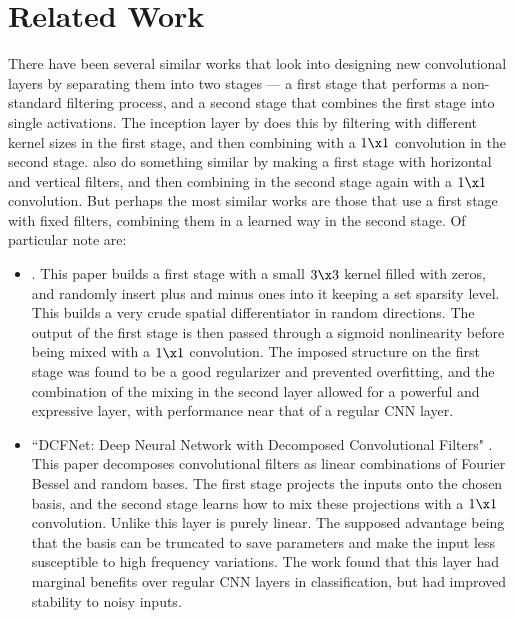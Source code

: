 \section{Related Work}\label{sec:ch5:related}

There have been several similar works that look into designing new convolutional
layers by separating them into two stages --- a first stage that performs a
non-standard filtering process, and a second stage that combines the first stage
into single activations. The inception layer 
\cite{szegedy_rethinking_2015} by \citeauthor*{szegedy_rethinking_2015} does this by filtering with different
kernel sizes in the first stage, and then combining with a $1\x 1$ convolution
in the second stage. \citeauthor*{ioannou_training_2015} also do something similar by making
a first stage with horizontal and vertical filters, and then combining in the
second stage again with a $1\x 1$ convolution\cite{ioannou_training_2015}. But perhaps the most similar
works are those that use a first stage with fixed filters, combining them in a
learned way in the second stage. Of particular note are:
\begin{itemize}
\item 
{} \cite{juefei-xu_local_2016}. This paper builds a
first stage with a small $3\x 3$ kernel filled with zeros, and randomly insert
plus and minus ones into it keeping a set sparsity level. This builds a very
crude spatial differentiator in random directions. The output of the first stage
is then passed through a sigmoid nonlinearity before being mixed with a $1\x 1$
convolution. The imposed structure on the first stage was found to be a good
regularizer and prevented overfitting, and the combination of the mixing in the
second layer allowed for a powerful and expressive layer, with performance near
that of a regular CNN layer.

\item
``DCFNet: Deep Neural Network with Decomposed Convolutional Filters"
\cite{qiu_dcfnet:_2018}. This paper decomposes convolutional filters as linear
combinations of Fourier Bessel and random bases.  The first stage projects the
inputs onto the chosen basis, and the second stage learns how to mix these
projections with a $1\x 1$ convolution. Unlike \cite{juefei-xu_local_2016} this
layer is purely linear. The supposed advantage being that the
basis can be truncated to save parameters and make the input less susceptible to
high frequency variations. The work found that this layer had marginal benefits
over regular CNN layers in classification, but had improved stability to noisy
inputs. 

\end{itemize}

